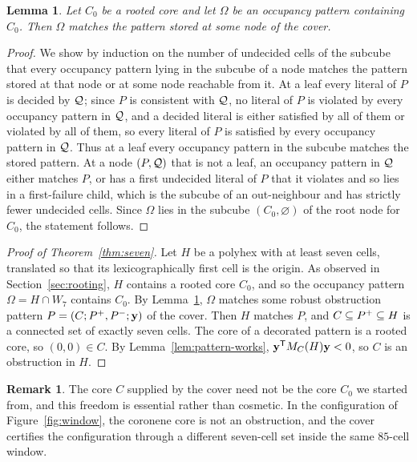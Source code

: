 \documentclass[11pt]{article}
\newcommand\tp{^{\mathsf T}}
\newtheorem{lemma}[theorem]{Lemma}
\theoremstyle{definition}
\newtheorem{remark}[theorem]{Remark}
\begin{document}
\begin{lemma}\label{lem:cover}
Let $C_0$ be a rooted core and let $\Omega$ be an occupancy pattern containing
$C_0$.  Then $\Omega$ matches the pattern stored at some node of the cover.
\end{lemma}

\begin{proof}
We show by induction on the number of undecided cells of the subcube that every
occupancy pattern lying in the subcube of a node matches the pattern stored at
that node or at some node reachable from it.  At a leaf every literal of $P$
is decided by ${\mathcal Q}$; since $P$ is consistent with ${\mathcal Q}$, no literal of $P$ is
violated by every occupancy pattern in ${\mathcal Q}$, and a decided literal is either
satisfied by all of them or violated by all of them, so every literal of $P$
is satisfied by every occupancy pattern in ${\mathcal Q}$.  Thus at a leaf every
occupancy pattern in the subcube matches the stored pattern.  At a node
$(P,{\mathcal Q})$ that is
not a leaf, an occupancy pattern in ${\mathcal Q}$ either matches $P$, or has a first
undecided literal of $P$ that it violates and so lies in a first-failure
child, which is the subcube of an out-neighbour and has strictly fewer
undecided cells.  Since $\Omega$ lies in the subcube $(C_0,\varnothing)$ of the root
node for $C_0$, the statement follows.
\end{proof}

\begin{proof}[Proof of Theorem~\ref{thm:seven}]
Let $H$ be a polyhex with at least seven cells, translated so that its
lexicographically first cell is the origin.  As
observed in Section~\ref{sec:rooting}, $H$ contains a rooted core $C_0$, and
so the occupancy pattern $\Omega=H\cap W_7$ contains $C_0$.  By
Lemma~\ref{lem:cover}, $\Omega$ matches some robust obstruction pattern
$P=(C;P^{+},P^{-};{\mathbf y})$ of the cover.  Then $H$ matches $P$, and
$C\subseteq P^{+}\subseteq H$ is a connected set of exactly seven cells.  The core of a
decorated pattern is a rooted core, so $(0,0)\in C$.  By
Lemma~\ref{lem:pattern-works}, $\Zy\tp M_C(H)\Zy<0$, so $C$ is an
obstruction in $H$.
\end{proof}

\begin{remark}\label{rem:core-changes}
The core $C$ supplied by the cover need not be the core $C_0$ we started
from, and this freedom is essential rather than cosmetic.  In the
configuration of Figure~\ref{fig:window}, the coronene core is not an
obstruction, and the cover certifies the configuration through a different
seven-cell set inside the same $85$-cell window.
\end{remark}
\end{document}
